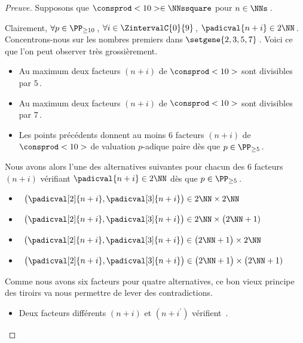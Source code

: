 \begin{proof}[Preuve]%
    Supposons que $\consprod<10> \in \NNssquare$ pour $n \in \NNs$\,.
    
    \smallskip
    
    Clairement, 
    $\forall p \in \PP_{\geq 10}$\,, 
    $\forall i \in \ZintervalC{0}{9}$\,, 
    $\padicval{n + i} \in 2 \NN$\,.
    Concentrons-nous sur les nombres premiers dans $\setgene{2, 3, 5, 7}$\,. Voici ce que l'on peut observer très grossièrement.
    \begin{itemize}
		\item Au maximum deux facteurs $(n + i)$ de $\consprod<10>$ sont divisibles par $5$\,.

		\item Au maximum deux facteurs $(n + i)$ de $\consprod<10>$ sont divisibles par $7$\,.

		\item Les points précédents donnent au moins $6$ facteurs $(n + i)$ de $\consprod<10>$ de valuation $p$-adique paire dès que $p \in \PP_{\geq 5}$\,.
    \end{itemize}
    
    Nous avons alors l'une des alternatives suivantes pour chacun des $6$ facteurs $(n+i)$ vérifiant $\padicval{n + i} \in 2 \NN$ dès que $p \in \PP_{\geq 5}$\,.
    \begin{itemize}
    	\smallskip
		\item {}\,
		$\big( \padicval[2]{n + i} , \padicval[3]{n + i} \big) \in 2 \NN \times 2 \NN$

    	\smallskip
		\item {}\,
		$\big( \padicval[2]{n + i} , \padicval[3]{n + i} \big) \in 2 \NN \times \big( 2 \NN + 1)$

    	\smallskip
		\item {}\,
		$\big( \padicval[2]{n + i} , \padicval[3]{n + i} \big) \in \big( 2 \NN + 1 \big) \times 2 \NN$

    	\smallskip
		\item {}\,
		$\big( \padicval[2]{n + i} , \padicval[3]{n + i} \big) \in \big( 2 \NN + 1 \big) \times \big( 2 \NN + 1)$
    \end{itemize}
    
    \medskip
    
    Comme nous avons six facteurs pour quatre alternatives, ce bon vieux principe des tiroirs va nous permettre de lever des contradictions.
    \begin{itemize}
    	\medskip
		\item Deux facteurs différents $(n+i)$ et $(n+i^\prime)$ vérifient \,.
		

\end{itemize}
\end{proof}
